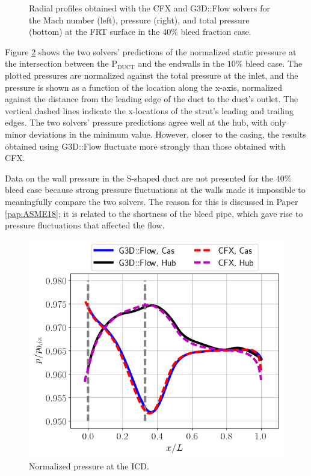 \begin{figure}[h!]
\begin{minipage}{0.48\columnwidth}
  \end{minipage}
  \caption{Radial profiles obtained with the CFX and G3D::Flow solvers for the Mach number (left), pressure (right), and total pressure (bottom) at the FRT surface in the $40\%$ bleed fraction case.} \label{fig:FRT40}
\end{figure}
Figure \ref{fig:duct10} shows the two solvers' predictions of the normalized static pressure at the intersection between the P$_\text{DUCT}$ and the endwalls in the $10\%$ bleed case. The plotted pressures are normalized against the total pressure at the inlet, and the pressure is shown as a function of the location along the x-axis, normalized against the distance from the leading edge of the duct to the duct's outlet. The vertical dashed lines indicate the x-locations of the strut's leading and trailing edges. The two solvers' pressure predictions agree well at the hub, with only minor deviations in the minimum value. However, closer to the casing, the results obtained using G3D::Flow fluctuate more strongly than those obtained with CFX. %

Data on the wall pressure in the S-shaped duct are not presented for the $40\%$ bleed case because strong pressure fluctuations at the walls made it impossible to meaningfully compare the two solvers. The reason for this is discussed in Paper \ref{pap:ASME18}; it is related to the shortness of the bleed pipe, which gave rise to pressure fluctuations that affected the flow.
\begin{figure}[h!]
  \centering
  \includegraphics[width=.8\textwidth]{Figures/CFXG3dDuct10.png}
    \caption{Normalized pressure at the ICD.} \label{fig:duct10}
\end{figure}

